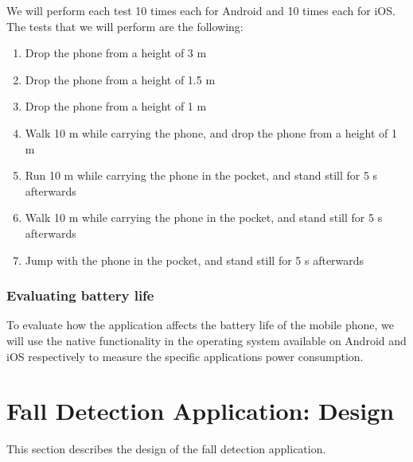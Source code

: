 \documentclass[12pt, a4paper, onecolumn]{article}
\begin{document}
	We will perform each test 10 times each for Android and 10 times each for iOS. The tests that we will perform are the following:
	
	\begin{enumerate}
		\item Drop the phone from a height of 3 m
		\item Drop the phone from a height of 1.5 m
		\item Drop the phone from a height of 1 m
		\item Walk 10 m while carrying the phone, and drop the phone from a height of 1 m
		\item Run 10 m while carrying the phone in the pocket, and stand still for 5 s afterwards
		\item Walk 10 m while carrying the phone in the pocket, and stand still for 5 s afterwards
		\item Jump with the phone in the pocket, and stand still for 5 s afterwards
	\end{enumerate}
	
	\subsubsection{Evaluating battery life}
	
	To evaluate how the application affects the battery life of the mobile phone, we will use the native functionality in the operating system available on Android and iOS respectively to measure the specific applications power consumption.
	
	\newpage
	\section{Fall Detection Application: Design} \label{section:application-design}
	
	This section describes the design of the fall detection application.
	
\end{document}
